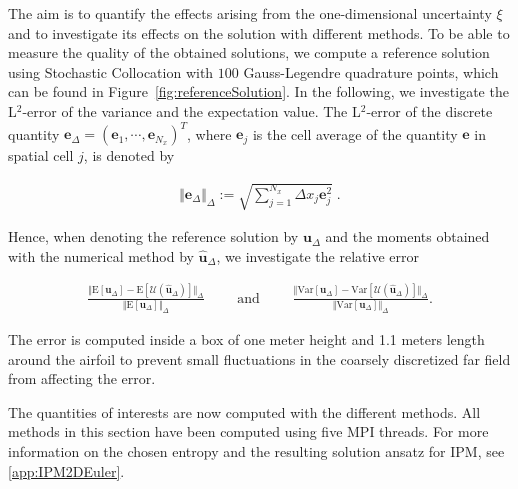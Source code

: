 The aim is to quantify the effects arising from the one-dimensional uncertainty $\xi$ and to investigate its effects on the solution with different methods. To be able to measure the quality of the obtained solutions, we compute a reference solution using Stochastic Collocation with $100$ Gauss-Legendre quadrature points, which can be found in Figure~\ref{fig:referenceSolution}. In the following, we investigate the L$^2$-error of the variance and the expectation value. The L$^2$-error of the discrete quantity $\bm e_{\Delta}=(\bm e_1,\cdots,\bm e_{N_x})^T$, where $\bm e_j$ is the cell average of the quantity $\bm e$ in spatial cell $j$, is denoted by
\begin{linenomath*}\begin{align*}
\Vert \bm e_{\Delta} \Vert_{\Delta} := \sqrt{\sum_{j=1}^{N_x} \Delta x_j \bm e_j^2}\;.
\end{align*}\end{linenomath*}
Hence, when denoting the reference solution by $\bm u_{\Delta}$ and the moments obtained with the numerical method by $\bm{\hat u}_{\Delta}$, we investigate the relative error
\begin{linenomath*}\begin{align*}
\frac{\Vert \text{E}[\bm u_{\Delta}] - \text{E}[\mathcal{U}(\bm{\hat u}_{\Delta})] \Vert_{\Delta}}{\Vert \text{E}[\bm u_{\Delta}] \Vert_{\Delta}} \qquad \text{ and }\qquad \frac{\Vert \text{Var}[\bm u_{\Delta}] - \text{Var}[\mathcal{U}(\bm{\hat u}_{\Delta})] \Vert_{\Delta}}{\Vert \text{Var}[\bm u_{\Delta}] \Vert_{\Delta}}.
\end{align*}\end{linenomath*}
The error is computed inside a box of one meter height and 1.1 meters length around the airfoil to prevent small fluctuations in the coarsely discretized far field from affecting the error.

The quantities of interests are now computed with the different methods. All methods in this section have been computed using five MPI threads. For more information on the chosen entropy and the resulting solution ansatz for IPM, see \ref{app:IPM2DEuler}. 

